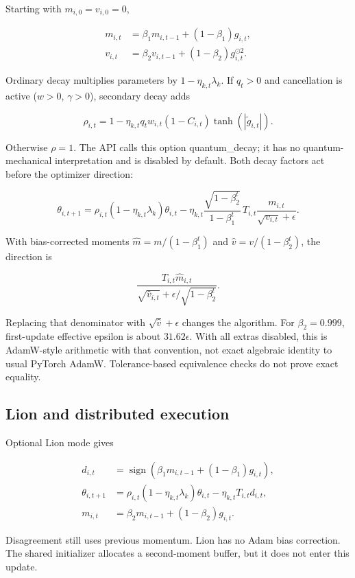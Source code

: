 \documentclass[11pt,a4paper]{article}
\begin{document}
Starting with $m_{i,0}=v_{i,0}=0$,

\[
\begin{aligned}
m_{i,t}&=\beta_1m_{i,t-1}+(1-\beta_1)g_{i,t},\\
v_{i,t}&=\beta_2v_{i,t-1}+(1-\beta_2)g_{i,t}^{\odot2}.
\end{aligned}
\]

Ordinary decay multiplies parameters by $1-\eta_{k,t}\lambda_k$. If $q_t>0$ and cancellation is active ($w>0$, $\gamma>0$), secondary decay adds

\[
\rho_{i,t}=1-\eta_{k,t}q_tw_{i,t}(1-C_{i,t})\tanh(|\widetilde g_{i,t}|).
\]

Otherwise $\rho=1$. The API calls this option quantum\_decay; it has no quantum-mechanical interpretation and is disabled by default. Both decay factors act before the optimizer direction:

\[
\boxed{\theta_{i,t+1}=\rho_{i,t}(1-\eta_{k,t}\lambda_k)\theta_{i,t}
-\eta_{k,t}\frac{\sqrt{1-\beta_2^t}}{1-\beta_1^t}\,T_{i,t}\frac{m_{i,t}}{\sqrt{v_{i,t}}+\epsilon}.}
\]

With bias-corrected moments $\widehat m=m/(1-\beta_1^t)$ and $\widehat v=v/(1-\beta_2^t)$, the direction is

\[
\frac{T_{i,t}\widehat m_{i,t}}{\sqrt{\widehat v_{i,t}}+\epsilon/\sqrt{1-\beta_2^t}}.
\]

Replacing that denominator with $\sqrt{\widehat v}+\epsilon$ changes the algorithm. For $\beta_2=0.999$, first-update effective epsilon is about $31.62\epsilon$. With all extras disabled, this is AdamW-style arithmetic with that convention, not exact algebraic identity to usual PyTorch AdamW. Tolerance-based equivalence checks do not prove exact equality.

\subsection{Lion and distributed execution}

Optional Lion mode gives

\[
\begin{aligned}
d_{i,t}&=\operatorname{sign}(\beta_1m_{i,t-1}+(1-\beta_1)g_{i,t}),\\
\theta_{i,t+1}&=\rho_{i,t}(1-\eta_{k,t}\lambda_k)\theta_{i,t}-\eta_{k,t}T_{i,t}d_{i,t},\\
m_{i,t}&=\beta_2m_{i,t-1}+(1-\beta_2)g_{i,t}.
\end{aligned}
\]

Disagreement still uses previous momentum. Lion has no Adam bias correction. The shared initializer allocates a second-moment buffer, but it does not enter this update.
\end{document}
